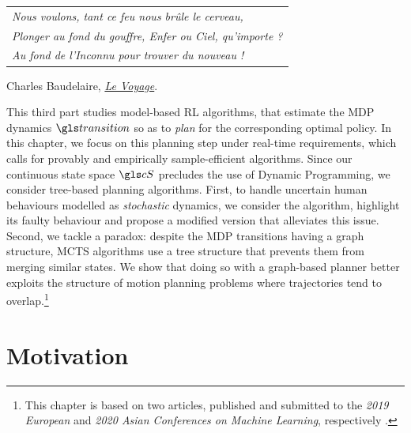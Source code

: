 
\graphicspath{{2-Chapters/6-Chapter/}}

\label{chapter:6}

\begin{flushright}
	\begin{tabular}{@{}l@{}}
		\emph{Nous voulons, tant ce feu nous brûle le cerveau,}\\
		\emph{Plonger au fond du gouffre, Enfer ou Ciel, qu’importe ?}\\
		\emph{Au fond de l’Inconnu pour trouver du nouveau !}\\
	\end{tabular}
	
	Charles Baudelaire, \href{https://eleurent.github.io/sisyphe/texts/le-voyage.html}{\emph{Le Voyage}}.
\end{flushright}

\abstractStartChapter{}%

This third part studies model-based \gls{RL} algorithms, that estimate the \gls{MDP} dynamics $\Ps$ so as to \emph{plan} for the corresponding optimal policy.
In this chapter, we focus on this planning step under real-time requirements, which calls for provably and empirically sample-efficient algorithms. Since our continuous state space $\cS$ precludes the use of Dynamic Programming, we consider tree-based planning algorithms. First, to handle uncertain human behaviours modelled as \emph{stochastic} dynamics, we consider the \OLOP algorithm, highlight its faulty behaviour and propose a modified version that alleviates this issue. Second, we tackle a paradox: despite the \gls{MDP} transitions having a graph structure, \gls{MCTS} algorithms use a tree structure that prevents them from merging similar states. We show that doing so with a graph-based planner better exploits the structure of motion planning problems where trajectories tend to overlap.\footnote{This chapter is based on two articles, published and submitted to the \emph{2019 European} and \emph{2020 Asian Conferences on Machine Learning}, respectively \citep{Leurent2020practical,Leurent2020monte}.}
\minitocStartChapter{}

\section{Motivation}

